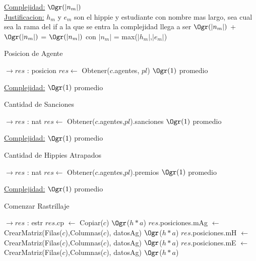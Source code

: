 \begin{Algoritmos}
\begin{algorithm}[H]
\underline{Complejidad:} $\Ogr(|n_m|)$ \\
\underline{Justificacion:} $h_m$ y $e_m$ son el hippie y estudiante con nombre mas largo, sea cual sea la rama del if a la que se entra la complejidad llega a ser 
$\Ogr(|n_m|)$ + $\Ogr(|n_m|)$ = $\Ogr(|n_m|)$ con $|n_m|$ = max($|h_m|$,$|e_m|$)
\end{algorithm}


\begin{algorithm}[H]
\caption{Posicion de Agente}
\begin{algorithmic}[1]
  $\to res$ : posicion
  \State $res \gets$ Obtener($c$.agentes, $pl$) \Comment $\Ogr(1)$ promedio
 \EndProcedure
\end{algorithmic}

 \underline{Complejidad:} $\Ogr(1)$ promedio
\end{algorithm}


\begin{algorithm}[H]
\caption{Cantidad de Sanciones}

\begin{algorithmic}[1]
 $\to res$ : nat
	\State $res \gets$ Obtener($c$.agentes,$pl$).sanciones \Comment $\Ogr(1)$ promedio
\EndProcedure
\end{algorithmic}
\underline{Complejidad:} $\Ogr(1)$ promedio
\end{algorithm}


\begin{algorithm}[H]
\caption{Cantidad de Hippies Atrapados}
\begin{algorithmic}[1]
 $\to res$ : nat
	\State $res \gets$ Obtener($c$.agentes,$pl$).premios \Comment $\Ogr(1)$ promedio
\EndProcedure
\end{algorithmic}
\underline{Complejidad:} $\Ogr(1)$ promedio
\end{algorithm}


\begin{algorithm}[H]
\caption{Comenzar Rastrillaje}

\begin{algorithmic}[1]
 $\to res$ : estr
	\State $res$.cp $\gets$ Copiar($c$) \Comment $\Ogr$($h*a$)
	\State $res$.posiciones.mAg $\gets$ CrearMatriz(Filas($c$),Columnas($c$), datosAg) \Comment $\Ogr$($h*a$)
	\State $res$.posiciones.mH $\gets$ CrearMatriz(Filas($c$),Columnas($c$), datosAg) \Comment $\Ogr$($h*a$)
	\State $res$.posiciones.mE $\gets$ CrearMatriz(Filas($c$),Columnas($c$), datosAg) \Comment $\Ogr$($h*a$)
	

\end{algorithmic}
\end{algorithm}
\end{Algoritmos}
